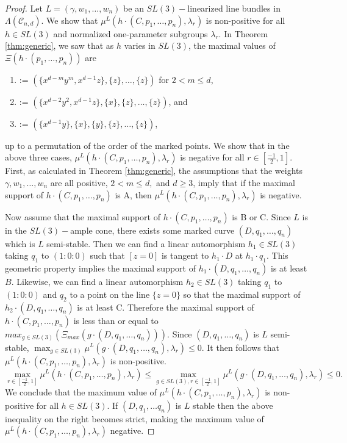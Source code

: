 \documentclass{amsart}
\newcommand{\mc}{\mathcal}
\numberwithin{equation}{section}
\theoremstyle{definition}
\begin{document}
\begin{proof}
Let $L = (\gamma, w_1, \dots , w_n)$ be an $SL(3)-$linearized line bundles in $\Lambda(\mc{C}_{n,d})$. We show that $\mu^L(h \cdot (C, p_1, \dots , p_n), \lambda_r)$ is non-positive for all $h \in SL(3)$ and normalized one-parameter subgroups $\lambda_r$. In Theorem \ref{thm:generic}, we saw that as $h$ varies in $SL(3)$, the maximal values of $\Xi(h \cdot (p_1, \dots , p_n))$ are 
\begin{enumerate}[label=\Alph*]
    \item := $(\{x^{d-m}y^m, x^{d-1}z\}, \{z\}, \dots , \{z\})$ for $2 < m \leq d$, 
    \item := $(\{x^{d-2}y^2, x^{d-1}z\}, \{x\}, \{z\}, \dots , \{z\})$, and
    \item := $(\{x^{d-1}y\}, \{x\}, \{y\}, \{z\}, \dots , \{z\})$,
\end{enumerate}
up to a permutation of the order of the marked points. We show that in the above three cases, $\mu^L(h \cdot (C, p_1, \dots , p_n), \lambda_r)$ is negative for all $r \in [\frac{-1}{2}, 1]$. First, as calculated in Theorem \ref{thm:generic}, the assumptions that the weights $\gamma, w_1, \dots , w_n$ are all positive, $2 < m \leq d,$ and $d \geq 3$, imply that if the maximal support of $h \cdot (C, p_1, \dots , p_n)$ is A, then $\mu^L(h \cdot (C, p_1, \dots , p_n), \lambda_r)$ is negative.

Now assume that the maximal support of $h \cdot (C, p_1, \dots , p_n)$ is B or C. Since $L$ is in the $SL(3)-$ample cone, there exists some marked curve $(D, q_1, \dots , q_n)$ which is $L$ semi-stable. Then we can find a linear automorphism $h_1 \in SL(3)$ taking $q_1$ to $(1:0:0)$ such that $[z=0]$ is tangent to $h_1 \cdot D$ at $h_1 \cdot q_1$. This geometric property implies the maximal support of $h_1 \cdot (D, q_1, \dots , q_n)$ is at least $B$. Likewise, we can find a linear automorphism $h_2 \in SL(3)$ taking $q_1$ to $(1:0:0)$ and $q_2$ to a point on the line $\{z=0\}$ so that the maximal support of  $h_2 \cdot (D, q_1, \dots , q_n)$ is at least C. Therefore the maximal support of $h \cdot (C, p_1, \dots , p_n)$ is less than or equal to $max_{g \in SL(3)} (\Xi_{max}(g \cdot (D, q_1, \dots , q_n)))$. Since  $(D, q_1, \dots , q_n)$ is $L$ semi-stable, $\max_{g \in SL(3)} \mu^L (g \cdot (D, q_1, \dots , q_n), \lambda_r) \leq 0$. It then follows that $\mu^L(h \cdot (C, p_1, \dots , p_n), \lambda_r)$ is non-positive.
$$\max_{r\in [\frac{-1}{2},1]} \mu^L(h \cdot (C, p_1 , \dots , p_n), \lambda_r) \leq \max_{g \in SL(3), r \in [\frac{-1}{2},1]} \mu^L (g \cdot (D, q_1, \dots , q_n), \lambda_r) \leq 0.$$
We conclude that the maximum value of $\mu^L(h \cdot (C, p_1, \dots , p_n), \lambda_r)$ is non-positive for all $h \in SL(3)$. If $(D, q_1, \dots q_n)$ is $L$ stable then the above inequality on the right becomes strict, making the maximum value of $\mu^L(h \cdot (C, p_1, \dots , p_n), \lambda_r)$ negative.
\end{proof}
\end{document}
